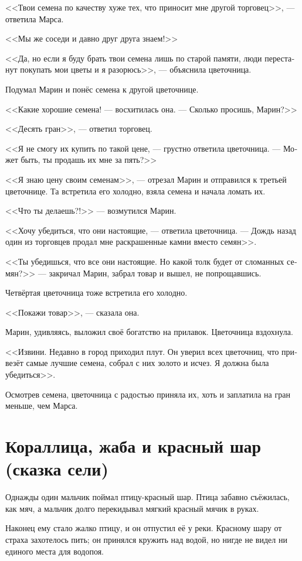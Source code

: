 \documentclass[a4paper,12pt,fleqn]{book}\usepackage{polyglossia}\setdefaultlanguage[babelshorthands=true]{russian}\setotherlanguage{english}\defaultfontfeatures{Ligatures=TeX,Mapping=tex-text}\usepackage{xcolor}\newcommand{\ml}[3]{#2}
\begin{document}
{<<Твои семена по качеству хуже тех, что приносит мне другой торговец>>, --- ответила Марса.

<<Мы же соседи и давно друг друга знаем!>>

<<Да, но если я буду брать твои семена лишь по старой памяти, люди перестанут покупать мои цветы и я разорюсь>>, --- объяснила цветочница.

Подумал Марин и понёс семена к другой цветочнице.

<<Какие хорошие семена! --- восхитилась она.
--- Сколько просишь, Марин?>>

<<Десять гран>>, --- ответил торговец.

<<Я не смогу их купить по такой цене, --- грустно ответила цветочница.
--- Может быть, ты продашь их мне за пять?>>

<<Я знаю цену своим семенам>>, --- отрезал Марин и отправился к третьей цветочнице.
Та встретила его холодно, взяла семена и начала ломать их.

<<Что ты делаешь?!>> --- возмутился Марин.

<<Хочу убедиться, что они настоящие, --- ответила цветочница.
--- Дождь назад один из торговцев продал мне раскрашенные камни вместо семян>>.

<<Ты убедишься, что все они настоящие.
Но какой толк будет от сломанных семян?>> --- закричал Марин, забрал товар и вышел, не попрощавшись.

Четвёртая цветочница тоже встретила его холодно.

<<Покажи товар>>, --- сказала она.

Марин, удивляясь, выложил своё богатство на прилавок.
Цветочница вздохнула.

<<Извини.
Недавно в город приходил плут.
Он уверил всех цветочниц, что привезёт самые лучшие семена, собрал с них золото и исчез.
Я должна была убедиться>>.

Осмотрев семена, цветочница с радостью приняла их, хоть и заплатила на гран меньше, чем Марса.

\section{Кораллица, жаба и красный шар (сказка сели)}

Однажды один мальчик поймал птицу-красный шар.
Птица забавно съёжилась, как мяч, а мальчик долго перекидывал мягкий красный мячик в руках.

Наконец ему стало жалко птицу, и он отпустил её у реки.
Красному шару от страха захотелось пить;
он принялся кружить над водой, но нигде не видел ни единого места для водопоя.

}
\end{document}
